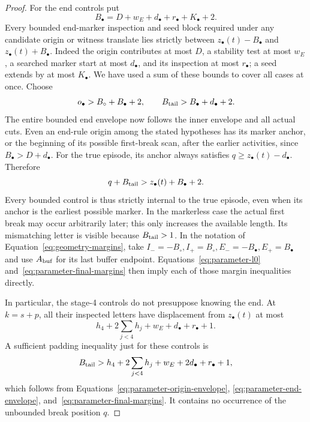 \begin{proof}
For the end controls put
\begin{equation}\label{eq:parameter-end-envelope}
 B_\bullet=D+w_E+d_\bullet+r_\bullet+K_\bullet+2.
\end{equation}
Every bounded end-marker inspection and seed block required under
any candidate origin or witness translate lies strictly between
\(z_\bullet(t)-B_\bullet\) and
\(z_\bullet(t)+B_\bullet\).
Indeed the origin contributes at most \(D\), a stability test at most
\(w_E\), a searched marker start at most \(d_\bullet\), and its
inspection at most \(r_\bullet\); a seed extends by at most
\(K_\bullet\).  We have used a sum of these bounds to cover all
cases at once.  Choose
\begin{equation}\label{eq:parameter-final-margins}
 o_\bullet>B_\circ+B_\bullet+2,
 \qquad B_{\rm tail}>B_\bullet+d_\bullet+2.
\end{equation}
The entire bounded end envelope now follows the inner envelope and
all actual cuts.  Even an end-rule origin among the stated
hypotheses has its marker anchor, or the beginning of its possible
first-break scan, after the earlier activities, since
\(B_\bullet>D+d_\bullet\).
For the true episode, its anchor always satisfies
\(q\ge z_\bullet(t)-d_\bullet\).  Therefore
\[
 q+B_{\rm tail}>z_\bullet(t)+B_\bullet+2.
\]
Every bounded control is thus strictly internal to the true episode,
even when its anchor is the earliest possible marker.  In the
markerless case the actual first break may occur arbitrarily later;
this only increases the available length.  Its mismatching letter
is visible because \(B_{\rm tail}>1\).  In the notation of Equation~\eqref{eq:geometry-margins}, take
\(I_-=-B_\circ,I_+=B_\circ,E_-=-B_\bullet,E_+=B_\bullet\)
and use \(A_{\rm buf}\) for its last buffer endpoint.  Equations~\ref{eq:parameter-l0}
and~\ref{eq:parameter-final-margins} then imply each of those
margin inequalities directly.

In particular, the stage-4 controls do not presuppose knowing the
end.  At \(k=s+p\), all their inspected letters have displacement
from \(z_\bullet(t)\) at most
\[
 h_4+2\sum_{j<4}h_j+w_E+d_\bullet+r_\bullet+1.
\]
A sufficient padding inequality just for these controls is
\begin{equation}\label{eq:parameter-stage4-padding}
 B_{\rm tail}>
 h_4+2\sum_{j<4}h_j+w_E+2d_\bullet+r_\bullet+1,
\end{equation}
which follows from Equations~\ref{eq:parameter-origin-envelope},
\ref{eq:parameter-end-envelope}, and~\ref{eq:parameter-final-margins}.
It contains no occurrence of the unbounded break position \(q\).


\end{proof}
